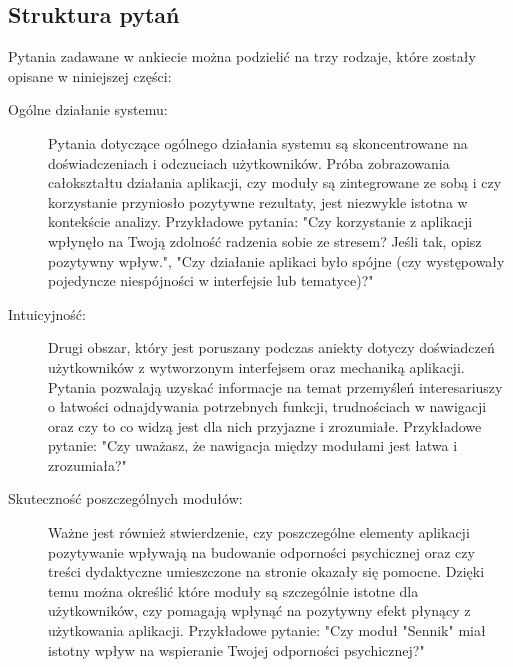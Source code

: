\subsection{Struktura pytań}
Pytania zadawane w ankiecie można podzielić na trzy rodzaje, które zostały
opisane w niniejszej części:
\begin{description}
    \item[Ogólne działanie systemu:] Pytania dotyczące ogólnego działania
    systemu są skoncentrowane na doświadczeniach i odczuciach użytkowników.
    Próba zobrazowania całokształtu działania aplikacji, czy moduły są
    zintegrowane ze sobą i czy korzystanie przyniosło pozytywne rezultaty, jest
    niezwykle istotna w kontekście analizy. Przykładowe pytania: "Czy
    korzystanie z aplikacji wpłynęło na Twoją zdolność radzenia sobie ze
    stresem? Jeśli tak, opisz pozytywny wpływ.", "Czy działanie aplikaci było
    spójne (czy występowały pojedyncze niespójności w interfejsie lub
    tematyce)?"
    \item[Intuicyjność:] Drugi obszar, który jest poruszany podczas aniekty
    dotyczy doświadczeń użytkowników z wytworzonym interfejsem oraz mechaniką
    aplikacji. Pytania pozwalają uzyskać informacje na temat przemyśleń
    interesariuszy o łatwości odnajdywania potrzebnych funkcji, trudnościach w
    nawigacji oraz czy to co widzą jest dla nich przyjazne i zrozumiałe.
    Przykładowe pytanie: "Czy uważasz, że nawigacja między modułami jest łatwa i
    zrozumiała?"
    \item[Skuteczność poszczególnych modułów:] Ważne jest również stwierdzenie,
    czy poszczególne elementy aplikacji pozytywanie wpływają na budowanie
    odporności psychicznej oraz czy treści dydaktyczne umieszczone na stronie
    okazały się pomocne. Dzięki temu można określić które moduły są szczególnie
    istotne dla użytkowników, czy pomagają wpłynąć na pozytywny efekt płynący z
    użytkowania aplikacji. Przykładowe pytanie: "Czy moduł "Sennik" miał istotny
    wpływ na wspieranie Twojej odporności psychicznej?"
\end{description}
